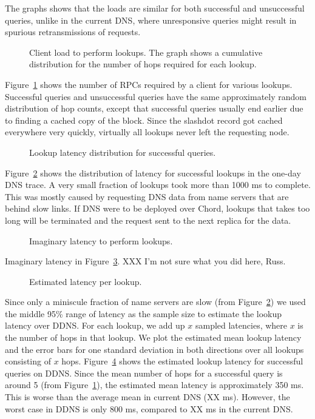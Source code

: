 The graphs shows that the loads are similar for both
successful and unsuccessful queries, unlike in the current
DNS, where unresponsive queries might result in spurious 
retransmissions of requests.

\begin{figure}
\caption{Client load to perform lookups. 
The graph shows a cumulative distribution for the number
of hops required for each lookup.}
\label{fig:hops}
\end{figure}

Figure~\ref{fig:hops} shows the number of RPCs required
by a client for various lookups.
Successful queries and unsuccessful queries have the same
approximately random distribution of hop counts, except
that successful queries usually end earlier due to finding
a cached copy of the block.
Since the slashdot record got cached everywhere very quickly,
virtually all lookups never left the requesting node.

\begin{figure}
\caption{Lookup latency distribution for successful queries.}
\label{fig:oklat}
\end{figure}

Figure~\ref{fig:oklat} shows the distribution of latency
for successful lookups in the one-day DNS trace. A very small
fraction of lookups took more than 1000 ms to complete. 
This was mostly caused by requesting DNS data from name servers
that are behind slow links. If DNS were to be deployed over 
Chord, lookups that takes too long will be terminated and 
the request sent to the next replica for the data.

\begin{figure}
\caption{Imaginary latency to perform lookups.}
\label{fig:imaglat}
\end{figure}

Imaginary latency in Figure~\ref{fig:imaglat}. 
XXX I'm not sure what you did here, Russ.

\begin{figure}
\caption{Estimated latency per lookup.}
\label{fig:hopslat}
\end{figure}

Since only a miniscule fraction of name servers are slow
(from Figure~\ref{fig:oklat}) we used the middle 95\% range
of latency as the sample size to estimate the lookup latency
over DDNS. For each lookup, we add up $x$ sampled latencies,
where $x$ is the number of hops in that lookup. We plot the 
estimated mean lookup latency and the error bars for one 
standard deviation in both directions over all lookups consisting
of $x$ hops. Figure~\ref{fig:hopslat} shows the estimated 
lookup latency for successful queries on DDNS. Since the mean
number of hops for a successful query is around 5 
(from Figure~\ref{fig:hops}), the estimated mean latency 
is approximately 350 ms. This is worse than the average mean in
current DNS (XX ms). However, the worst case in DDNS is only 800 ms,
compared to XX ms in the current DNS.

